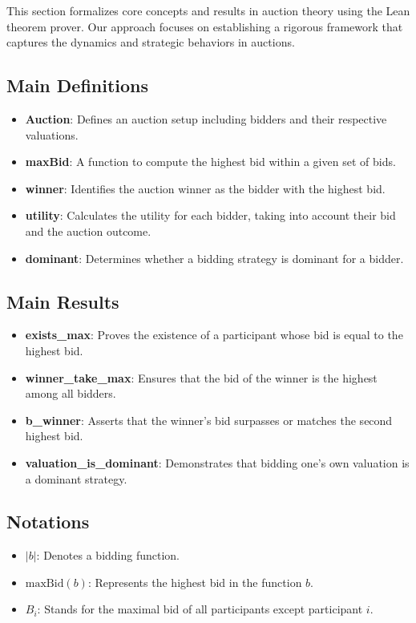 This section formalizes core concepts and results in auction theory using the Lean theorem prover. Our approach focuses on establishing a rigorous framework that captures the dynamics and strategic behaviors in auctions.

\subsection{Main Definitions}

\begin{itemize}
    \item \textbf{Auction}: Defines an auction setup including bidders and their respective valuations.
    \item \textbf{maxBid}: A function to compute the highest bid within a given set of bids.
    \item \textbf{winner}: Identifies the auction winner as the bidder with the highest bid.
    \item \textbf{utility}: Calculates the utility for each bidder, taking into account their bid and the auction outcome.
    \item \textbf{dominant}: Determines whether a bidding strategy is dominant for a bidder.
\end{itemize}

\subsection{Main Results}

\begin{itemize}
    \item \textbf{exists\_max}: Proves the existence of a participant whose bid is equal to the highest bid.
    \item \textbf{winner\_take\_max}: Ensures that the bid of the winner is the highest among all bidders.
    \item \textbf{b\_winner}: Asserts that the winner's bid surpasses or matches the second highest bid.
    \item \textbf{valuation\_is\_dominant}: Demonstrates that bidding one's own valuation is a dominant strategy.
\end{itemize}

\subsection{Notations}

\begin{itemize}
    \item \( |b| \): Denotes a bidding function.
    \item \( \text{maxBid}(b) \): Represents the highest bid in the function \( b \).
    \item \( B_i \): Stands for the maximal bid of all participants except participant \( i \).
\end{itemize}

